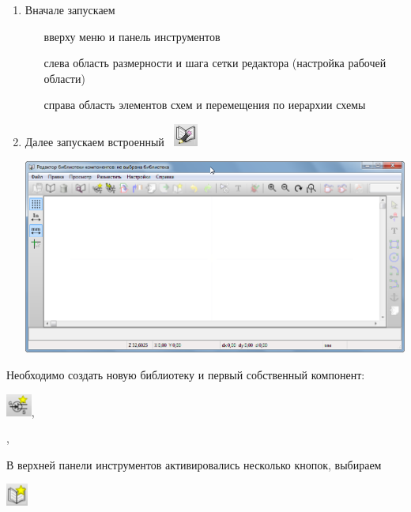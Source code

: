 \begin{enumerate}
  \item Вначале запускаем 
  \begin{itemize}
    \item[вверху] меню и панель инструментов 
    \item[слева] область размерности и шага сетки редактора (настройка рабочей
    области)
    \item[справа] область элементов схем и перемещения по иерархии схемы
  \end{itemize}
  \item Далее запускаем встроенный 
  \ \includegraphics[height=2em]{kicad/ee22.png}

\includegraphics[height=0.5\textheight]{kicad/lib23.png}
\end{enumerate}

Необходимо создать новую библиотеку и первый собственный компонент:

\includegraphics[height=2em]{kicad/newel.png},

,




\bigskip

В верхней панели инструментов активировались несколько кнопок, выбираем

\includegraphics[height=2em]{kicad/lib26.png}

